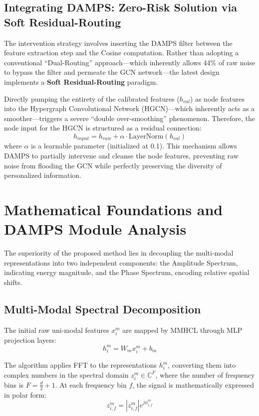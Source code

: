 \documentclass[12pt, a4paper]{article}
\begin{document}
\subsection{Integrating DAMPS: Zero-Risk Solution via Soft Residual-Routing}
The intervention strategy involves inserting the DAMPS filter between the feature extraction step and the Cosine computation. Rather than adopting a conventional ``Dual-Routing'' approach---which inherently allows 44\% of raw noise to bypass the filter and permeate the GCN network---the latest design implements a \textbf{Soft Residual-Routing} paradigm.

Directly pumping the entirety of the calibrated features ($h_{cal}$) as node features into the Hypergraph Convolutional Network (HGCN)---which inherently acts as a smoother---triggers a severe ``double over-smoothing'' phenomenon. Therefore, the node input for the HGCN is structured as a residual connection:
\begin{equation}
h_{input} = h_{raw} + \alpha \cdot \text{LayerNorm}(h_{cal})
\end{equation}
where $\alpha$ is a learnable parameter (initialized at 0.1). This mechanism allows DAMPS to partially intervene and cleanse the node features, preventing raw noise from flooding the GCN while perfectly preserving the diversity of personalized information.

\section{Mathematical Foundations and DAMPS Module Analysis}
The superiority of the proposed method lies in decoupling the multi-modal representations into two independent components: the Amplitude Spectrum, indicating energy magnitude, and the Phase Spectrum, encoding relative spatial shifts.

\subsection{Multi-Modal Spectral Decomposition}
The initial raw uni-modal features $x_i^m$ are mapped by MMHCL through MLP projection layers:
\begin{equation}
h_i^m = W_m x_i^m + b_m
\end{equation}

The algorithm applies FFT to the representations $h_i^m$, converting them into complex numbers in the spectral domain $z_i^m \in \mathbb{C}^F$, where the number of frequency bins is $F = \frac{d}{2} + 1$. At each frequency bin $f$, the signal is mathematically expressed in polar form:
\begin{equation}
z_{i,f}^m = |z_{i,f}^m|e^{j\phi_{i,f}^m}
\end{equation}
\end{document}
